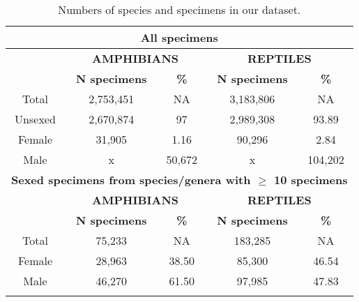 
\begin{longtable}{ccccc}

\caption{Numbers of species and specimens in our dataset.}\\ 
  
\hline
\multicolumn{5}{c}{\textbf{All specimens}}\\
  \hline
  & \multicolumn{2}{c}{\textbf{AMPHIBIANS}} & \multicolumn{2}{c}{\textbf{REPTILES}} \\
  \hline
  & \textbf{N specimens} & \textbf{\%} & \textbf{N specimens} & \textbf{\%}\\
  \hline
  Total & 2,753,451 & NA & 3,183,806 & NA\\
  Unsexed & 2,670,874 & 97 & 2,989,308 & 93.89\\
  Female & 31,905 & 1.16 & 90,296   & 2.84\\
  Male & x & 50,672 & x & 104,202\\
  \hline

\multicolumn{5}{c}{\textbf{Sexed specimens from species/genera with $\geq$ 10 specimens}}\\
  \hline
  & \multicolumn{2}{c}{\textbf{AMPHIBIANS}} & \multicolumn{2}{c}{\textbf{REPTILES}} \\
  \hline
  & \textbf{N specimens} & \textbf{\%} & \textbf{N specimens} & \textbf{\%}\\
\hline
Total & 75,233 & NA & 183,285 & NA\\
Female & 28,963 & 38.50 & 85,300 & 46.54\\
Male & 46,270 & 61.50 & 97,985 & 47.83\\
\hline

\label{table_numbers}
\end{longtable}





